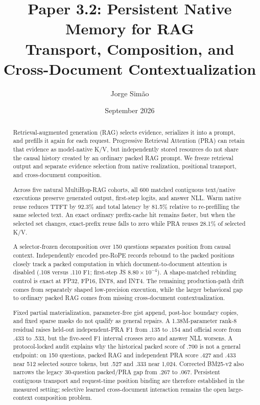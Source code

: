 \documentclass[11pt]{article}
\title{Paper 3.2: Persistent Native Memory for RAG\\
\large Transport, Composition, and Cross-Document Contextualization}
\author{Jorge Sim\~ao}
\date{September 2026}
\begin{document}
\maketitle

\begin{abstract}
Retrieval-augmented generation (RAG) selects evidence, serializes it into a
prompt, and prefills it again for each request. Progressive Retrieval Attention
(PRA) can retain that evidence as model-native K/V, but independently stored
resources do not share the causal history created by an ordinary packed RAG
prompt. We freeze retrieval output and separate evidence selection from native
realization, positional transport, and cross-document composition.

Across five natural MultiHop-RAG cohorts, all 600 matched contiguous
text/native executions preserve generated output, first-step logits, and answer
NLL. Warm native reuse reduces TTFT by 92.3\% and total latency by 81.5\%
relative to re-prefilling the same selected text. An exact ordinary prefix-cache
hit remains faster, but when the selected set changes, exact-prefix reuse falls
to zero while PRA reuses 28.1\% of selected K/V.

A selector-frozen decomposition over 150 questions separates position from
causal context. Independently encoded pre-RoPE records rebound to the packed
positions closely track a packed computation in which document-to-document
attention is disabled (.108 versus .110 F1; first-step JS
$8.80\times10^{-4}$). A shape-matched rebinding control is exact at FP32,
FP16, INT8, and INT4. The remaining production-path drift comes from separately
shaped low-precision execution, while the larger behavioral gap to ordinary
packed RAG comes from missing cross-document contextualization.

Fixed partial materialization, parameter-free gist append, post-hoc boundary
copies, and fixed sparse masks do not qualify as general repairs. A
1.38M-parameter rank-8 residual raises held-out independent-PRA F1 from .135
to .154 and official score from .433 to .533, but the five-seed F1 interval
crosses zero and answer NLL worsens. A protocol-locked audit explains why the
historical packed score of .700 is not a general endpoint: on 150 questions,
packed RAG and independent PRA score .427 and .433 near 512 selected source
tokens, but .527 and .333 near 1,024. Corrected BM25-v2 also narrows the legacy
30-question packed/PRA gap from .267 to .067. Persistent contiguous transport
and request-time position binding are therefore established in the measured
setting; selective learned cross-document interaction remains the open
large-context composition problem.
\end{abstract}
\end{document}
